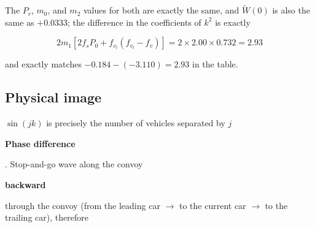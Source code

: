 \documentclass[11pt,a4paper,openany]{book}
\numberwithin{equation}{chapter}
\numberwithin{figure}{chapter}
\numberwithin{table}{chapter}
\begin{document}
The $P_r$, $m_0$, and $m_2$ values for both are exactly the same, and $\widetilde W(0)$ is also the same as $+0.0333$; the difference in the coefficients of $k^2$ is exactly

\begin{equation}
2m_1\left[2f_sP_0+f_{v_l}\left(f_{v_l}-f_v\right)\right] = 2\times2.00\times0.732 = 2.93
\end{equation}

and exactly matches $-0.184-(-3.110)=2.93$ in the table.










\subsection{Physical image}










$\sin(jk)$ is precisely the number of vehicles separated by $j$




\textbf{Phase difference}




. Stop-and-go wave along the convoy




\textbf{backward}




through the convoy (from the leading car $\to$ to the current car $\to$ to the trailing car), therefore
\end{document}

